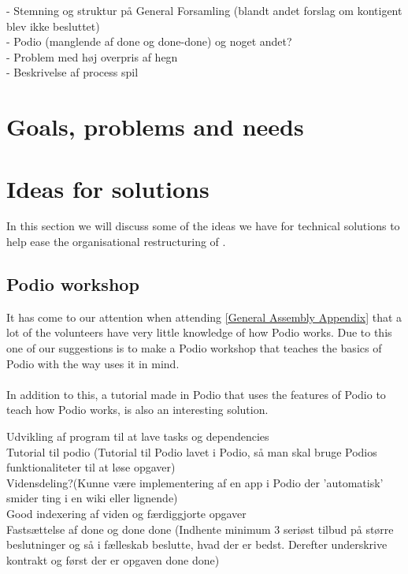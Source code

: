 - Stemning og struktur på General Forsamling (blandt andet forslag om kontigent blev ikke besluttet)\\
- Podio (manglende af done og done-done) og noget andet?\\
- Problem med høj overpris af hegn\\
- Beskrivelse af process spil

\section{Goals, problems and needs}


\section{Ideas for solutions}
In this section we will discuss some of the ideas we have for technical
solutions to help ease the organisational restructuring of \mil.
\subsection{Podio workshop}
It has come to our attention when attending \ref{General Assembly Appendix} that
a lot of the volunteers have very little knowledge of how Podio works. Due to
this one of our suggestions is to make a Podio workshop that teaches the basics
of Podio with the way \mil uses it in mind.
\\
\\
In addition to this, a tutorial made in Podio that uses the features of Podio to
teach how Podio works, is also an interesting solution.

Udvikling af program til at lave tasks og dependencies\\
Tutorial til podio (Tutorial til Podio lavet i Podio, så man skal bruge Podios funktionaliteter til at løse opgaver)\\
Vidensdeling?(Kunne være implementering af en app i Podio der 'automatisk' smider ting i en wiki eller lignende)\\
Good indexering af viden og færdiggjorte opgaver\\
Fastsættelse af done og done done (Indhente minimum 3 seriøst tilbud på større beslutninger og så i fælleskab beslutte, hvad der er bedst. Derefter underskrive kontrakt
og først der er opgaven done done)


